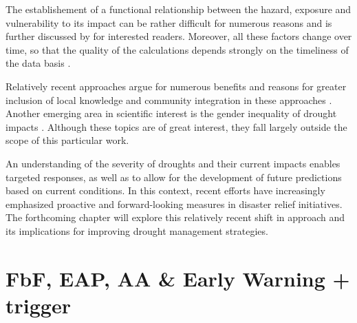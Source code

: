 The establishement of a functional relationship between the hazard, exposure and vulnerability to its impact can be rather difficult for numerous reasons and is further discussed by \autocite{boultDroughtImpactbasedForecasting2022} for interested readers. Moreover, all these factors change over time, so that the quality of the calculations depends strongly on the timeliness of the data basis \autocite{harrowsmithFutureForecastImpact2020}. 

Relatively recent approaches argue for numerous benefits and reasons for greater inclusion of local knowledge and community integration in these approaches \autocite{balehegnIndigenousWeatherClimate2019,dubeFrameworkIntegrationTraditional2016,ebhuomaFrameworkIntegratingScientific2020,giordanoIntegrationLocalScientific2013a,greyIntegratingLocalIndigenous2020,hermansExploringIntegrationLocal2022a,mercerCultureDisasterRisk2012,mutasaKnowledgeApartheidDisaster2015,nyetanyaneIntegrationIndigenousKnowledge2020,nyongValueIndigenousKnowledge2007}. Another emerging area in scientific interest is the gender inequality of drought impacts \autocite{acharyaWhenRiverTalks2019,fanningDroughtDisplacementLivelihoods2018,hiwasakiLocalIndigenousKnowledge2015,mustafaGenderingFloodEarly2015,sachsRoutledgeHandbookGender2020,saniGenderOtherVulnerabilities2022}. Although these topics are of great interest, they fall largely outside the scope of this particular work.

An understanding of the severity of droughts and their current impacts enables targeted responses, as well as to allow for the development of future predictions based on current conditions. In this context, recent efforts have increasingly emphasized proactive and forward-looking measures in disaster relief initiatives. The forthcoming chapter will explore this relatively recent shift in approach and its implications for improving drought management strategies.

\section{FbF, EAP, AA & Early Warning + trigger}

